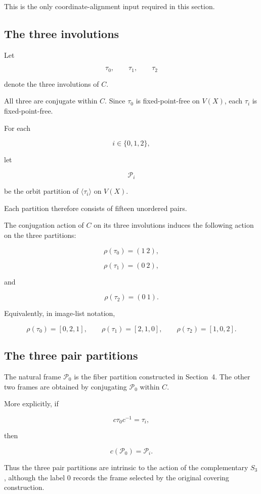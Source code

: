 This is the only coordinate-alignment input required in this section.

\subsection{The three involutions}

Let

\[
\tau_{0},
\qquad
\tau_{1},
\qquad
\tau_{2}
\]

denote the three involutions of \(C\).

All three are conjugate within \(C\). Since \(\tau_{0}\) is
fixed-point-free on \(V(X)\), each \(\tau_i\) is fixed-point-free.

For each

\[
i\in\{0,1,2\},
\]

let

\[
\mathcal P_i
\]

be the orbit partition of \(\langle\tau_i\rangle\) on \(V(X)\).

Each partition therefore consists of fifteen unordered pairs.

The conjugation action of \(C\) on its three involutions induces the
following action on the three partitions:

\[
\rho(\tau_{0})=(1\ 2),
\]

\[
\rho(\tau_{1})=(0\ 2),
\]

and

\[
\rho(\tau_{2})=(0\ 1).
\]

Equivalently, in image-list notation,

\[
\rho(\tau_{0})=[0,2,1],
\qquad
\rho(\tau_{1})=[2,1,0],
\qquad
\rho(\tau_{2})=[1,0,2].
\]

\subsection{The three pair partitions}

The natural frame \(\mathcal P_0\) is the fiber partition constructed in
Section~4. The other two frames are obtained by conjugating
\(\mathcal P_0\) within \(C\).

More explicitly, if

\[
c\tau_{0}c^{-1}=\tau_i,
\]

then

\[
c(\mathcal P_0)=\mathcal P_i.
\]

Thus the three pair partitions are intrinsic to the action of the
complementary \(S_3\), although the label \(0\) records the frame selected
by the original covering construction.

